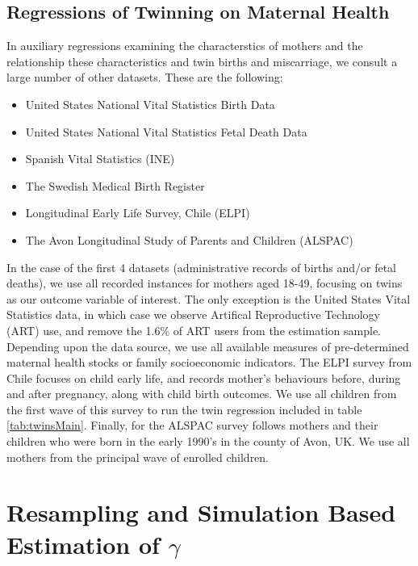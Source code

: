 \documentclass[a4paper, 11pt]{article}
\theoremstyle{plain}
\begin{document}
\subsection{Regressions of Twinning on Maternal Health}
In auxiliary regressions examining the characterstics of mothers and the
relationship these characteristics and twin births and miscarriage, we consult
a large number of other datasets.  These are the following:
\begin{itemize}
\item United States National Vital Statistics Birth Data
\item United States National Vital Statistics Fetal Death Data
\item Spanish Vital Statistics (INE)
\item The Swedish Medical Birth Register
\item Longitudinal Early Life Survey, Chile (ELPI)
\item The Avon Longitudinal Study of Parents and Children (ALSPAC)
\end{itemize}

In the case of the first 4 datasets (administrative records of births and/or
fetal deaths), we use all recorded instances for mothers aged 18-49, focusing 
on twins as our outcome variable of interest.  The only exception is the United
States Vital Statistics data, in which case we observe Artifical Reproductive
Technology (ART) use, and remove the 1.6\% of ART users from the estimation sample. 
Depending upon the data source, we use all available measures of pre-determined 
maternal health stocks or family socioeconomic indicators.  The ELPI survey from 
Chile focuses on child early life, and records mother's behaviours before, during 
and after pregnancy, along with child birth outcomes.  We use all children from the 
first wave of this survey to run the twin regression included in table 
\ref{tab:twinsMain}. Finally, for the ALSPAC survey follows mothers and their
children who were born in the early 1990's in the county of Avon, UK.  We use all
mothers from the principal wave of enrolled children.

\section{Resampling and Simulation Based Estimation of $\gamma$}
\label{ATWINscn:gammaSim}
\end{document}

